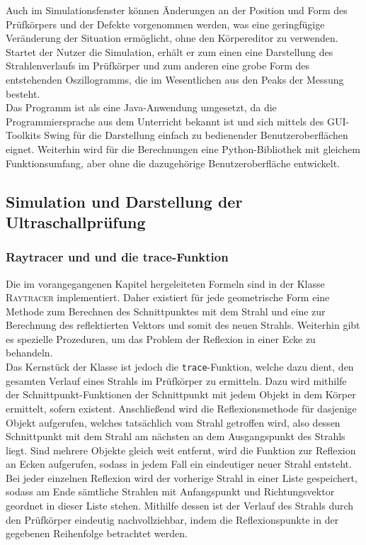 \documentclass[reducespace,stylepage,semiarbeit]{spezidoc}
\begin{document}
Auch im Simulationsfenster können Änderungen an der Position und Form des Prüfkörpers und der Defekte vorgenommen werden, was eine geringfügige Veränderung der Situation ermöglicht, ohne den Körpereditor zu verwenden.
Startet der Nutzer die Simulation, erhält er zum einen eine Darstellung des Strahlenverlaufs im Prüfkörper und zum anderen eine grobe Form des entstehenden Oszillogramms, die im Wesentlichen aus den Peaks der Messung besteht. \\
Das Programm ist als eine Java-Anwendung umgesetzt, da die Programmiersprache aus dem Unterricht bekannt ist und sich mittels des GUI-Toolkits Swing für die Darstellung einfach zu bedienender Benutzeroberflächen eignet.
Weiterhin wird für die Berechnungen eine Python-Bibliothek mit gleichem Funktionsumfang, aber ohne die dazugehörige Benutzeroberfläche entwickelt.

\subsection{Simulation und Darstellung der Ultraschallprüfung}

\subsubsection{Raytracer und und die trace-Funktion}
Die im vorangegangenen Kapitel hergeleiteten Formeln sind in der Klasse \textsc{Raytracer} implementiert. 
Daher existiert für jede geometrische Form eine Methode zum Berechnen des Schnittpunktes mit dem Strahl und eine zur Berechnung des reflektierten Vektors und somit des neuen Strahls. 
Weiterhin gibt es spezielle Prozeduren, um das Problem der Reflexion in einer Ecke zu behandeln.\\
Das Kernstück der Klasse ist jedoch die \texttt{trace}-Funktion, welche dazu dient, den gesamten Verlauf eines Strahls im Prüfkörper zu ermitteln. 
Dazu wird mithilfe der Schnittpunkt-Funktionen der Schnittpunkt mit jedem Objekt in dem Körper ermittelt, sofern existent. 
Anschließend wird die Reflexionsmethode für dasjenige Objekt aufgerufen, welches tatsächlich vom Strahl getroffen wird, also dessen Schnittpunkt mit dem Strahl am nächsten an dem Ausgangspunkt des Strahls liegt. 
Sind mehrere Objekte gleich weit entfernt, wird die Funktion zur Reflexion an Ecken aufgerufen, sodass in jedem Fall ein eindeutiger neuer Strahl entsteht.\\
Bei jeder einzelnen Reflexion wird der vorherige Strahl in einer Liste gespeichert, sodass am Ende sämtliche Strahlen mit Anfangspunkt und Richtungsvektor geordnet in dieser Liste stehen. 
Mithilfe dessen ist der Verlauf des Strahls durch den Prüfkörper eindeutig nachvollziehbar, indem die Reflexionspunkte in der gegebenen Reihenfolge betrachtet werden.
\end{document}
